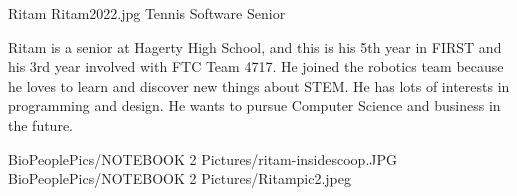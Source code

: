 \insertbio
{Ritam}
{Ritam2022.jpg}
{Tennis}
{Software}
{Senior}
{
Ritam is a senior at Hagerty High School, and this is his 5th year in FIRST and his 3rd year involved with FTC Team 4717. He joined the robotics team because he loves to learn and discover new things about STEM. He has lots of interests in programming and design. He wants to pursue Computer Science and business in the future.

}
{BioPeoplePics/NOTEBOOK 2 Pictures/ritam-insidescoop.JPG}
{BioPeoplePics/NOTEBOOK 2 Pictures/Ritampic2.jpeg}
